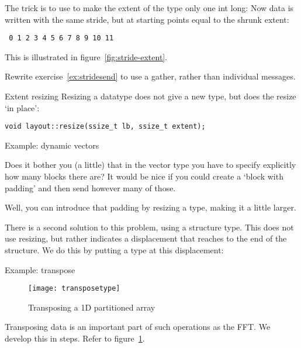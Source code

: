 The trick is to use 
to make the extent of the type only one int long:
%
%
Now data is written with the same stride, but
at starting points equal to the shrunk extent:
\begin{verbatim}
 0 1 2 3 4 5 6 7 8 9 10 11
\end{verbatim}

This is illustrated in figure~\ref{fig:stride-extent}.

\begin{exercise}[stridesend]
  \label{ex:stridesendsized}
  Rewrite exercise~\ref{ex:stridesend} to use a gather,
  rather than individual messages.
\end{exercise}

\begin{mplnote}{Extent resizing}
  Resizing a datatype does not give a new type, but
  does the resize `in place':
\begin{lstlisting}
void layout::resize(ssize_t lb, ssize_t extent);
\end{lstlisting}
\end{mplnote}

 {Example: dynamic vectors}

Does it bother you (a little) that in the vector type you
have to specify explicitly how many blocks there are?
It would be nice if you could create a `block with padding'
and then send however many of those.

Well, you can introduce that padding by resizing a type,
making it a little larger.


There is a second solution to this problem, using a structure type.
This does not use resizing, but rather indicates a displacement
that reaches to the end of the structure. We do this
by putting a type  at this displacement:


 {Example: transpose}

\begin{figure}[ht]
  \texttt{[image: transposetype]}
  \caption{Transposing a 1D partitioned array}
  \label{fig:transposetype} 
\end{figure}
Transposing data is an important part of such operations as the \ac{FFT}.
We develop this in steps. Refer to figure~\ref{fig:transposetype}.

